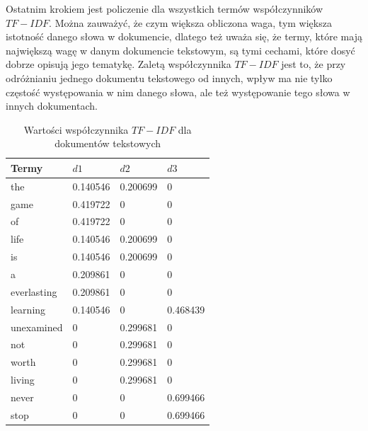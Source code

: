         Ostatnim krokiem jest policzenie dla wszystkich termów współczynników $TF-IDF$. Można zauważyć, że czym większa obliczona waga, tym większa istotność danego słowa w dokumencie, dlatego też uważa się, że termy, które mają największą wagę w danym dokumencie tekstowym, są tymi cechami, które dosyć dobrze opisują jego tematykę. Zaletą współczynnika $TF-IDF$ jest to, że przy odróżnianiu jednego dokumentu tekstowego od innych, wpływ ma nie tylko częstość występowania w nim danego słowa, ale też występowanie tego słowa w innych dokumentach. 
        \begin{table}[h!]
            \centering
            \caption{Wartości współczynnika $TF-IDF$ dla dokumentów tekstowych}
            \label{tfidf}
            \begin{tabular}{|l|l|l|l|}
            \hline
            Termy       & $d1$       & $d2$       & $d3$       \\ \hline
            the         & 0.140546 & 0.200699 & 0        \\ \hline
            game        & 0.419722 & 0        & 0        \\ \hline
            of          & 0.419722 & 0        & 0        \\ \hline
            life        & 0.140546 & 0.200699 & 0        \\ \hline
            is          & 0.140546 & 0.200699 & 0        \\ \hline
            a           & 0.209861 & 0        & 0        \\ \hline
            everlasting & 0.209861 & 0        & 0        \\ \hline
            learning    & 0.140546 & 0        & 0.468439 \\ \hline
            unexamined  & 0        & 0.299681 & 0        \\ \hline
            not         & 0        & 0.299681 & 0        \\ \hline
            worth       & 0        & 0.299681 & 0        \\ \hline
            living      & 0        & 0.299681 & 0        \\ \hline
            never       & 0        & 0        & 0.699466 \\ \hline
            stop        & 0        & 0        & 0.699466 \\ \hline
            \end{tabular}
        \end{table}
        

